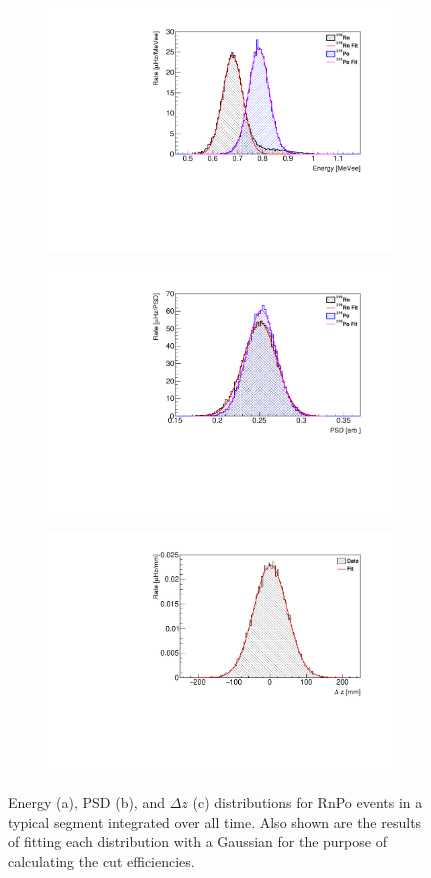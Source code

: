 \begin{figure}[H]
	\begin{subfigure}{0.5\linewidth}
	\centering
	\includegraphics[width=0.95\linewidth]{tex/6-ac227-images/AD_RateCalc/RnPoEn_Seg76}
	\caption{}
	\label{fig:rnpoenseg76}
\end{subfigure}%
\begin{subfigure}{0.5\linewidth}
	\centering
	\includegraphics[width=0.95\linewidth]{tex/6-ac227-images/AD_RateCalc/RnPoPSD_Seg76}
	\caption{}
	\label{fig:rnpopsdseg76}
\end{subfigure}
\begin{subfigure}{1\linewidth}
	\centering
	\includegraphics[width=0.475\linewidth]{tex/6-ac227-images/AD_RateCalc/RnPoDz_Seg76}
	\caption{}
	\label{fig:rnpodzseg76}
\end{subfigure}
\caption{Energy (a), PSD (b), and $\Delta z$ (c) distributions for RnPo events in a typical segment integrated over all time. Also shown are the results of fitting each distribution with a Gaussian for the purpose of calculating the cut efficiencies.}
\label{fig:RnPoDist}
\end{figure}


